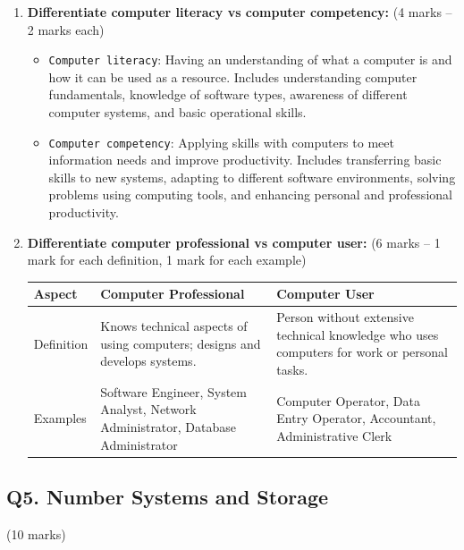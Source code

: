 \documentclass[12pt]{article}
\begin{document}
\begin{enumerate}[label=(\alph*)]
    \item \textbf{Differentiate computer literacy vs computer competency:} \hfill (4 marks -- 2 marks each)

    \begin{itemize}
        \item \texttt{Computer literacy}: Having an understanding of what a computer is and how it can be used as a resource. Includes understanding computer fundamentals, knowledge of software types, awareness of different computer systems, and basic operational skills.
        \item \texttt{Computer competency}: Applying skills with computers to meet information needs and improve productivity. Includes transferring basic skills to new systems, adapting to different software environments, solving problems using computing tools, and enhancing personal and professional productivity.
    \end{itemize}

    \item \textbf{Differentiate computer professional vs computer user:} \hfill (6 marks -- 1 mark for each definition, 1 mark for each example)

    \begin{center}
    \begin{tabular}{|p{3.5cm}|p{5cm}|p{5cm}|}
        \hline
        \textbf{Aspect} & \textbf{Computer Professional} & \textbf{Computer User} \\
        \hline
        Definition & Knows technical aspects of using computers; designs and develops systems. & Person without extensive technical knowledge who uses computers for work or personal tasks. \\
        Examples & Software Engineer, System Analyst, Network Administrator, Database Administrator & Computer Operator, Data Entry Operator, Accountant, Administrative Clerk \\
        \hline
    \end{tabular}
    \end{center}
\end{enumerate}

\bigskip

\subsection*{Q5. Number Systems and Storage} \hfill (10 marks)
\end{document}
